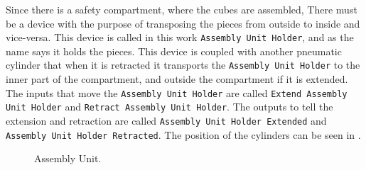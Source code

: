 Since there is a safety compartment, where the cubes are assembled, There must
be a device with the purpose of transposing the pieces from outside to inside
and vice-versa. This device is called in this work
\verb|Assembly Unit Holder|, and as the name says it holds the pieces. This
device is coupled with another pneumatic cylinder that when it is retracted
it transports the \verb|Assembly Unit Holder| to the inner part of the
compartment, and outside the compartment if it is extended. The inputs that move
the \verb|Assembly Unit Holder| are called
\verb|Extend Assembly Unit Holder| and
\verb|Retract Assembly Unit Holder|. The outputs to tell the extension and
retraction are called \verb|Assembly Unit Holder Extended|
and \verb|Assembly Unit Holder Retracted|. The position of the cylinders can be
seen in .
\begin{figure}[H]
  \centering
  \caption{Assembly Unit.}
  \label{fig:assemblyUnit}
\end{figure}

